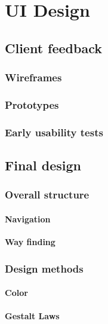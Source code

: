 \chapter{UI Design} \label{ch:ui_design}

\section{Client feedback}

\subsection{Wireframes}

\subsection{Prototypes}

\subsection{Early usability tests}


\section{Final design}

\subsection{Overall structure}

\subsubsection*{Navigation}

\textbf{Way finding}

\subsection{Design methods}

\subsubsection*{Color}

\subsubsection*{Gestalt Laws}

